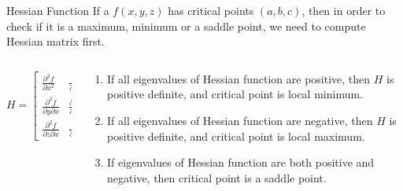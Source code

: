 \documentclass[aspectratio=169,xcolor=dvipsnames,svgnames,x11names,fleqn]{beamer}
\begin{document}
\begin{frame}{Hessian Function}
If a $f(x, y, z)$ has critical points $(a, b, c)$, then in order to check if it is a maximum, minimum or a saddle point, we need to compute Hessian matrix first.

\begin{columns}
\begin{column}{0.5\linewidth}
    
\begin{equation*}
H = \begin{bmatrix}
\frac{\partial^2 f}{\partial x^2} & \frac{\partial^2 f}{\partial x \partial y} & \frac{\partial^2 f}{\partial x \partial z} \\
\frac{\partial^2 f}{\partial y \partial x} & \frac{\partial^2 f}{\partial y^2} & \frac{\partial^2 f}{\partial y \partial z} \\
\frac{\partial^2 f}{\partial z \partial x} & \frac{\partial^2 f}{\partial z \partial y} & \frac{\partial^2 f}{\partial z^2}
\end{bmatrix}
\end{equation*}
\end{column}
\begin{column}{0.5\linewidth}
    \begin{enumerate}
    \item If all eigenvalues of Hessian function are positive, then $H$ is positive definite, and critical point is local minimum.
    \item If all eigenvalues of Hessian function are negative, then $H$ is positive definite, and critical point is local maximum.
    \item If eigenvalues of Hessian function are  both positive and negative, then critical point is a saddle point.
    \end{enumerate}
\end{column}
\end{columns}


\end{frame}
\end{document}
